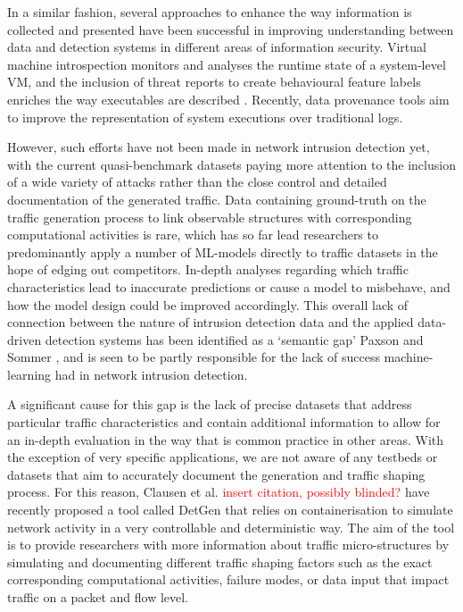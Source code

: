 \documentclass[conference]{IEEEtran}
\begin{document}
In a similar fashion, several approaches to enhance the way information is collected and presented have been successful in improving understanding between data and detection systems in different areas of information security. Virtual machine introspection monitors and analyses the runtime state of a system-level VM, and the inclusion of threat reports to create behavioural feature labels enriches the way executables are described \cite{smith2020mind}. Recently, data provenance tools aim to improve the representation of system executions \cite{barre2019mining} over traditional logs. 

However, such efforts have not been made in network intrusion detection yet, with the current quasi-benchmark datasets paying more attention to the inclusion of a wide variety of attacks rather than the close control and detailed documentation of the generated traffic. Data containing ground-truth on the traffic generation process to link observable structures with corresponding computational activities is rare, which has so far lead researchers to predominantly apply a number of ML-models directly to traffic datasets in the hope of edging out competitors. In-depth analyses regarding which traffic characteristics lead to inaccurate predictions or cause a model to misbehave,
and how the model design could be improved accordingly. This overall lack of connection between the nature of intrusion detection data and the applied data-driven detection systems has been identified as a `semantic gap' Paxson and Sommer \cite{sommer2010outside}, and is seen to be partly responsible for the lack of success machine-learning had in network intrusion detection.

A significant cause for this gap is the lack of precise datasets that address particular traffic characteristics and contain additional information to allow for an in-depth evaluation in the way that is common practice in other areas. With the exception of very specific applications, we are not aware of any testbeds or datasets that aim to accurately document the generation and traffic shaping process. For this reason, 
Clausen et al. \textcolor{red}{insert citation, possibly blinded?} have recently proposed a tool called DetGen that relies on containerisation to simulate network activity in a very controllable and deterministic way. The aim of the tool is to provide researchers with more information about traffic micro-structures by simulating and documenting different traffic shaping factors such as the exact corresponding computational activities, failure modes, or data input that impact traffic on a packet and flow level. 
\end{document}
